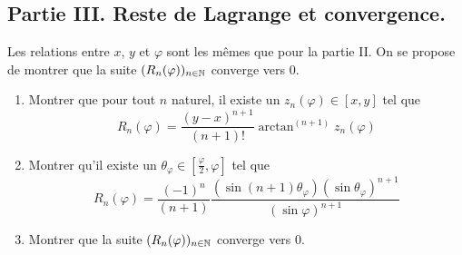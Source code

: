 \subsection*{Partie III. Reste de Lagrange et convergence.}
Les relations entre $x$, $y$ et $\varphi$ sont les mêmes que pour la partie II. On se propose de montrer que la suite $(R_n(\varphi))_{n\in \mathbb{N}}$ converge vers $0$.
\begin{enumerate}
 \item Montrer que pour tout $n$ naturel, il existe un $z_n(\varphi)\in [x,y]$ tel que
\begin{displaymath}
 R_n(\varphi) = \frac{(y-x)^{n+1}}{(n+1)!}\arctan^{(n+1)} z_n(\varphi)
\end{displaymath}

\item Montrer qu'il existe un $\theta_\varphi\in [\frac{\varphi}{2},\varphi]$ tel que
\begin{displaymath}
 R_n(\varphi) = \frac{(-1)^n}{(n+1)} \frac{(\sin(n+1)\theta_\varphi)(\sin \theta_\varphi)^{n+1}}{(\sin \varphi)^{n+1}}
\end{displaymath}

\item Montrer que la suite $(R_n(\varphi))_{n\in \mathbb{N}}$ converge vers $0$.
\end{enumerate}



